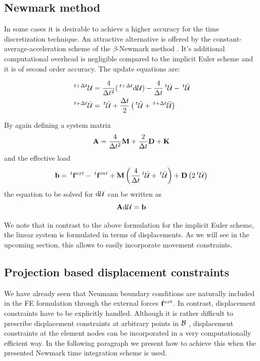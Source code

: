 \subsection{Newmark method}
\label{NewmarkSection}

In some cases it is desirable to achieve a higher accuracy for the time discretization technique. An attractive alternative is offered by the constant-average-acceleration scheme of the $\beta$-Newmark method \cite{Belytschko2000}. It's additional computational overhead is negligible compared to the implicit Euler scheme and it is of second order accuracy. The update equations are:

\begin{alignat}{1}
& \mtvh \mcu = \frac{4}{\mdt^2}(\mtvh \mcdu) - \frac{4}{\mdt} \mth \mcv - \mth \mca \notag \\
& \mtvh \mcv = \mth \mcv + \frac{\mdt}{2} \left( \mth \mca+ \mtvh \mca \right) 
\label{UpdateNewmark}
\end{alignat}

By again defining a system matrix 
\begin{equation}
\mathbf{ A } = \frac{4}{\Delta t ^2} \mathbf M + \frac{2}{\Delta t } \mathbf D +\mathbf K 
\label{SysMatNewmark}
\end{equation}
and the effective load
\begin{equation}
\mathbf{ b} = \mth \mfext - \mth \mfint + \mmmat \left( \frac{4}{\mdt} \mth \mcv + \mth \mca \right) + \mdmat \left( 2 \mth \mcv \right)  
\label{EffLoadNewmark}
\end{equation}
the equation to be solved for $\textnormal{d}{\mathcal{U}} $ can be written as
\begin{equation}
\mathbf{ A } \textnormal{d}{\mathcal{U}}  = \mathbf{ b }
\label{LinearSystemNewmark}
\end{equation}

We note that in contrast to the above formulation for the implicit Euler scheme, the linear system is formulated in terms of displacements. As we will see in the upcoming section, this allows to easily incorporate movement constraints.

\subsection{Projection based displacement constraints}
\label{SectionProjectionBaedConstraints}

We have already seen that Neumann boundary conditions are naturally included in the FE formulation through the external forces $\mathbf f ^{ext}$. In contrast, displacement constraints have to be explicitly handled. Although it is rather difficult to prescribe displacement constraints at arbitrary points in $\mathcal{B} $ \cite{Belytschko2000}, displacement constraints at the element nodes can be incorporated in a very computationally efficient way. In the following paragraph we present how to achieve this when the presented Newmark time integration scheme is used. 

